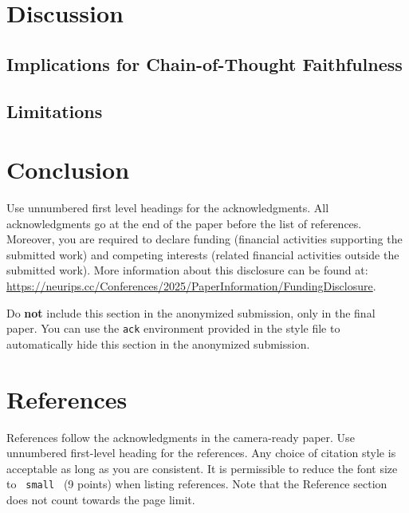 \documentclass{article}
\begin{document}


\section{Discussion}

\subsection{Implications for Chain-of-Thought Faithfulness}

\subsection{Limitations}

\section{Conclusion}


\begin{ack}
Use unnumbered first level headings for the acknowledgments. All acknowledgments
go at the end of the paper before the list of references. Moreover, you are required to declare
funding (financial activities supporting the submitted work) and competing interests (related financial activities outside the submitted work).
More information about this disclosure can be found at: \url{https://neurips.cc/Conferences/2025/PaperInformation/FundingDisclosure}.


Do {\bf not} include this section in the anonymized submission, only in the final paper. You can use the \texttt{ack} environment provided in the style file to automatically hide this section in the anonymized submission.
\end{ack}

\section*{References}


References follow the acknowledgments in the camera-ready paper. Use unnumbered first-level heading for
the references. Any choice of citation style is acceptable as long as you are
consistent. It is permissible to reduce the font size to \verb + small + (9 points) when listing references.
Note that the Reference section does not count towards the page limit.
\medskip
\end{document}
